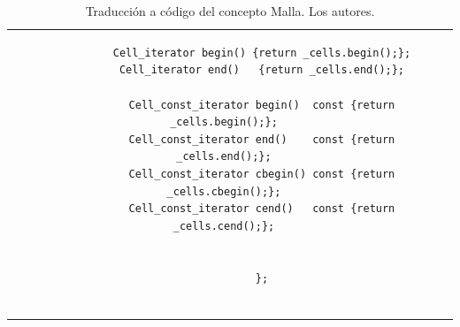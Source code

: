 \begin{table}[h]
\begin{tabular}{cc}
\begin{tiny}
\begin{lstlisting}
			Cell_iterator begin() {return _cells.begin();};
			Cell_iterator end()   {return _cells.end();};
			
			Cell_const_iterator begin()  const {return _cells.begin();};
			Cell_const_iterator end()    const {return _cells.end();};
			Cell_const_iterator cbegin() const {return _cells.cbegin();};
			Cell_const_iterator cend()   const {return _cells.cend();};
			
			
			};
			
			\end{lstlisting}
		\end{tiny}
	\end{tabular}
	\label{tab:MeshCode}
	\caption[Traducción a código del concepto Malla.]{Traducción a código del concepto Malla. Los autores.}
\end{table}



